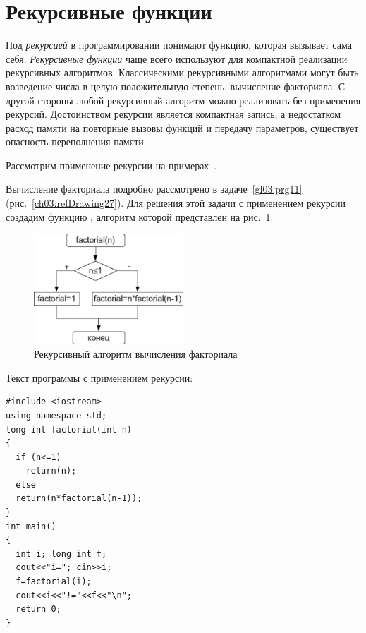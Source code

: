 \section[Рекурсивные функции]{Рекурсивные функции}
Под \emph{рекурсией} в программировании понимают функцию, которая вызывает сама себя.
\emph{Рекурсивные функции} чаще всего используют для компактной реализации
рекурсивных алгоритмов. Классическими рекурсивными алгоритмами могут быть возведение числа в целую положительную
степень, вычисление факториала. С другой стороны любой рекурсивный алгоритм можно реализовать без применения рекурсий.
Достоинством рекурсии является компактная запись, а недостатком расход памяти на повторные вызовы функций и передачу
параметров, существует опасность переполнения памяти.

Рассмотрим применение рекурсии на примерах~\cite{C,Shim}. %


Вычисление факториала подробно рассмотрено в задаче~\ref{gl03:prg11} 
(рис.~\ref{ch03:refDrawing27}). Для решения этой задачи с применением рекурсии
создадим функцию , алгоритм которой представлен на рис.~\ref{ch04:refDrawing9}. 

\begin{figure}[htb]
\begin{center}
\includegraphics[width=0.5\textwidth]{img/ris_4_10}
\caption{Рекурсивный алгоритм вычисления факториала}
\label{ch04:refDrawing9}
\end{center}
\end{figure}


Текст программы с применением рекурсии:
\begin{lstlisting}
#include <iostream>
using namespace std;
long int factorial(int n)
{
  if (n<=1) 
    return(n); 
  else 
  return(n*factorial(n-1)); 
}
int main()
{
  int i; long int f;
  cout<<"i="; cin>>i;
  f=factorial(i); 
  cout<<i<<"!="<<f<<"\n"; 
  return 0;
}
\end{lstlisting}

